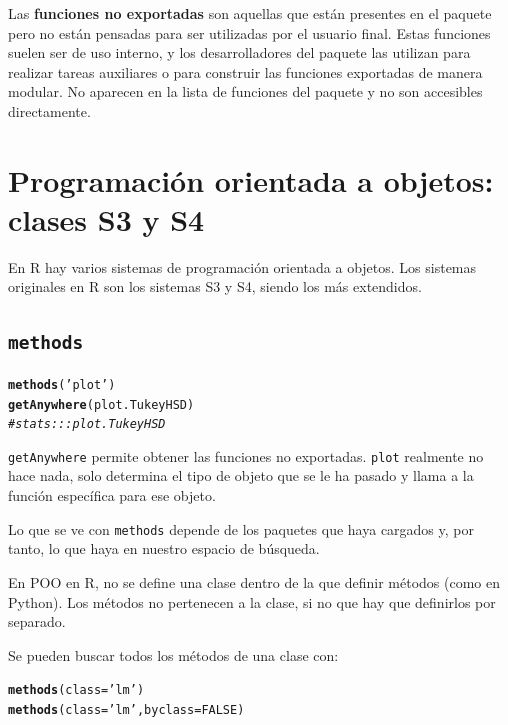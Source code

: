 \documentclass{config/apuntes}\usepackage[]{graphicx}\usepackage[]{xcolor}
\makeatletter
\newcommand{\hlnum}[1]{\textcolor[rgb]{0.686,0.059,0.569}{#1}}%
\newcommand{\hlsng}[1]{\textcolor[rgb]{0.192,0.494,0.8}{#1}}%
\newcommand{\hlcom}[1]{\textcolor[rgb]{0.678,0.584,0.686}{\textit{#1}}}%
\newcommand{\hldef}[1]{\textcolor[rgb]{0.345,0.345,0.345}{#1}}%
\newcommand{\hlkwc}[1]{\textcolor[rgb]{0.333,0.667,0.333}{#1}}%
\newcommand{\hlkwd}[1]{\textcolor[rgb]{0.737,0.353,0.396}{\textbf{#1}}}%
\newenvironment{kframe}{%
 \def\at@end@of@kframe{}%
 \ifinner\ifhmode%
  \def\at@end@of@kframe{\end{minipage}}%
  \begin{minipage}{\columnwidth}%
 \fi\fi%
 \def\FrameCommand##1{\hskip\@totalleftmargin \hskip-\fboxsep
 \colorbox{shadecolor}{##1}\hskip-\fboxsep
     \hskip-\linewidth \hskip-\@totalleftmargin \hskip\columnwidth}%
 \MakeFramed {\advance\hsize-\width
   \@totalleftmargin\z@ \linewidth\hsize
   \@setminipage}}%
 {\par\unskip\endMakeFramed%
 \at@end@of@kframe}
\newenvironment{knitrout}{}{} %
\newcommand{\code}[1]{\texttt{#1}}
\makeatother
\begin{document}
Las \textbf{funciones no exportadas} son aquellas que están presentes en el paquete pero no están pensadas para ser utilizadas por el usuario final. Estas funciones suelen ser de uso interno, y los desarrolladores del paquete las utilizan para realizar tareas auxiliares o para construir las funciones exportadas de manera modular. No aparecen en la lista de funciones del paquete y no son accesibles directamente.

\chapter{Programación orientada a objetos: clases S3 y S4}
En R hay varios sistemas de programación orientada a objetos. Los sistemas originales en R son los sistemas S3 y S4, siendo los más extendidos. 

\section{\code{methods}}
\begin{knitrout}
\color{fgcolor}\begin{kframe}
\begin{alltt}
\hlkwd{methods}\hldef{(}\hlsng{'plot'}\hldef{)}
\hlkwd{getAnywhere}\hldef{(plot.TukeyHSD)}
\hlcom{#stats:::plot.TukeyHSD}
\end{alltt}
\end{kframe}
\end{knitrout}

\code{getAnywhere} permite obtener las funciones no exportadas. \code{plot} realmente no hace nada, solo determina el tipo de objeto que se le ha pasado y llama a la función específica para ese objeto.

Lo que se ve con \code{methods} depende de los paquetes que haya cargados y, por tanto, lo que haya en nuestro espacio de búsqueda. 

En POO en R, no se define una clase dentro de la que definir métodos (como en Python). Los métodos no pertenecen a la clase, si no que hay que definirlos por separado. 

Se pueden buscar todos los métodos de una clase con:
\begin{knitrout}
\color{fgcolor}\begin{kframe}
\begin{alltt}
\hlkwd{methods}\hldef{(}\hlkwc{class} \hldef{=} \hlsng{'lm'}\hldef{)}
\hlkwd{methods}\hldef{(}\hlkwc{class} \hldef{=} \hlsng{'lm'}\hldef{,} \hlkwc{byclass} \hldef{=} \hlnum{FALSE}\hldef{)}
\end{alltt}
\end{kframe}
\end{knitrout}
\end{document}
